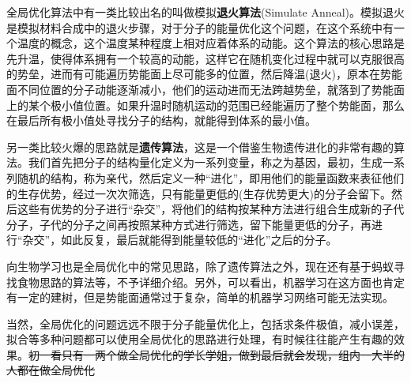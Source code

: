 \documentclass[12pt,a4paper,openany,twoside]{book}
\numberwithin{equation}{section}
\begin{document}
      全局优化算法中有一类比较出名的叫做模拟\textbf{退火算法}(Simulate Anneal)。模拟退火是模拟材料合成中的退火步骤，对于分子的能量优化这个问题，在这个系统中有一个温度的概念，这个温度某种程度上相对应着体系的动能。这个算法的核心思路是先升温，使得体系拥有一个较高的动能，这样它在随机变化过程中就可以克服很高的势垒，进而有可能遍历势能面上尽可能多的位置，然后降温(退火)，原本在势能面不同位置的分子动能逐渐减小，他们的运动进而无法跨越势垒，就落到了势能面上的某个极小值位置。如果升温时随机运动的范围已经能遍历了整个势能面，那么在最后所有极小值处寻找分子的结构，就能得到体系的最小值。

      另一类比较火爆的思路就是\textbf{遗传算法}，这是一个借鉴生物遗传进化的非常有趣的算法。我们首先把分子的结构量化定义为一系列变量，称之为基因，最初，生成一系列随机的结构，称为亲代，然后定义一种“进化”，即用他们的能量函数来表征他们的生存优势，经过一次次筛选，只有能量更低的(生存优势更大)的分子会留下。然后这些有优势的分子进行“杂交”，将他们的结构按某种方法进行组合生成新的子代分子，子代的分子之间再按照某种方式进行筛选，留下能量更低的分子，再进行“杂交”，如此反复，最后就能得到能量较低的“进化”之后的分子。

      向生物学习也是全局优化中的常见思路，除了遗传算法之外，现在还有基于蚂蚁寻找食物思路的算法等，不予详细介绍。另外，可以看出，机器学习在这方面也肯定有一定的建树，但是势能面通常过于复杂，简单的机器学习网络可能无法实现。

      当然，全局优化的问题远远不限于分子能量优化上，包括求条件极值，减小误差，拟合等多种问题都可以使用全局优化的思路进行处理，有时候往往能产生有趣的效果。\sout{初一看只有一两个做全局优化的学长学姐，做到最后就会发现，组内一大半的人都在做全局优化}
\end{document}
